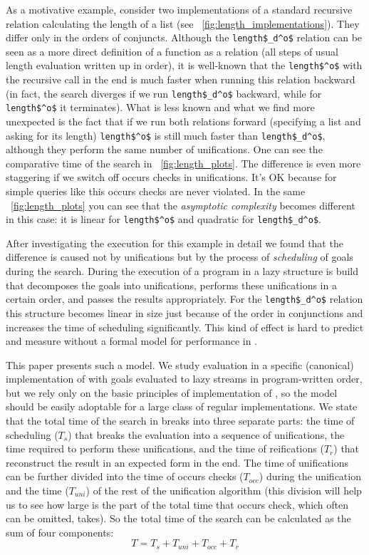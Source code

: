 As a motivative example, consider two implementations of a standard recursive relation calculating the length of a list (see \figureword~\ref{fig:length_implementations}). They differ only in the
orders of conjuncts. Although the \lstinline|length$_d^o$| relation can be seen as a more direct definition of a function as a relation (all steps of usual length evaluation written up in order),
it is well-known that the \lstinline|length$^o$| with the recursive call in the end is much faster when running this relation backward (in fact, the search diverges if we
run \lstinline|length$_d^o$| backward, while for \lstinline|length$^o$| it terminates). What is less known and what we find more unexpected is the fact that if we run both relations
forward (specifying a list and asking for its length) \lstinline|length$^o$| is still much faster than \lstinline|length$_d^o$|, although they perform the same number of unifications. One can see the comparative time of the search in \figureword~\ref{fig:length_plots}. The difference is even
more staggering if we switch off occurs checks in unifications. It's OK because for simple queries like this occurs checks are never violated. In the same \figureword~\ref{fig:length_plots} you can see that
the \emph{asymptotic complexity} becomes different in this case: it is linear for \lstinline|length$^o$| and quadratic for \lstinline|length$_d^o$|.

After investigating the execution for this example in detail we found that the difference is caused not by unifications but by the process of \emph{scheduling} of goals during the search.
During the execution of a program in \mK a lazy structure is build that decomposes the goals into unifications, performs these unifications in a certain order, and passes the results
appropriately. For the \lstinline|length$_d^o$| relation this structure becomes linear in size just because of the order in conjunctions and increases the time of
scheduling significantly. This kind of effect is hard to predict and measure without a formal model for performance in \mK.

This paper presents such a model. We study evaluation in a specific (canonical) implementation of \mK with goals evaluated to lazy streams in program-written order, but we rely only on the basic principles of implementation of \mK, so the model should be easily adoptable for a large class of regular implementations. We state that the total time of the search in \mK breaks into three separate parts: the time of scheduling ($T_s$) that breaks the evaluation into a sequence of
unifications, the time required to perform these unifications, and the time of reifications ($T_r$) that reconstruct the result in an expected form in the end. The time of unifications can be further
divided into the time of occurs checks ($T_{occ}$) during the unification and the time ($T_{uni}$) of the rest of the unification algorithm (this division will help us to see how large
is the part of the total time that occurs check, which often can be omitted, takes). So the total time of the search can be calculated as the sum of four components:
\noindent
\[ T = T_s + T_{uni} + T_{occ} + T_r \]

